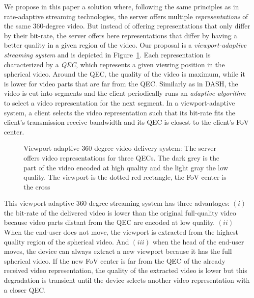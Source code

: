 We propose in this paper a solution where, following the same
principles as in rate-adaptive streaming technologies, the server
offers multiple \emph{representations} of the same 360-degree video.
But instead of offering representations that only differ by their
bit-rate, the server offers here representations that differ by having
a better quality in a given region of the video. Our proposal is a
\emph{viewport-adaptive streaming system} and is depicted in
Figure~\ref{fig:deliverychain}. Each representation is characterized
by a \emph{\ac{QEC}}, which represents a given viewing position in the
spherical video. Around the \ac{QEC}, the quality of the video is
maximum, while it is lower for video parts that are far from the
\ac{QEC}. Similarly as in \ac{DASH}, the video is cut into segments
and the client periodically runs an \emph{adaptive algorithm} to
select a video representation for the next segment. In a
viewport-adaptive system, a client selects the video representation
such that its bit-rate fits the client's transmission receive
bandwidth and its \ac{QEC} is closest to the client's \ac{FoV} center.

\setlength{\textfloatsep}{12pt}
\setlength{\intextsep}{9pt}
\begin{figure}%

   \centering
   
   \caption{Viewport-adaptive 360-degree video delivery system: The server
   offers video representations for three \acp{QEC}. The dark grey is the part of the video encoded at high quality and the light
   gray the low quality. The viewport is the dotted red rectangle, the \ac{FoV} center is the
   cross}
   \label{fig:deliverychain}
\end{figure}

This viewport-adaptive 360-degree streaming system has three
advantages: $(i)$ the bit-rate of the delivered video is lower than
the original full-quality video because video parts distant from the
\ac{QEC} are encoded at low quality. $(ii)$ When the end-user does not
move, the viewport is extracted from the highest quality region of the
spherical video. And $(iii)$ when the head of the end-user moves, the
device can always extract a new viewport because it has the full
spherical video. If the new \ac{FoV} center is far from the \ac{QEC}
of the already received video representation, the quality of the
extracted video is lower but this degradation is transient until the
device selects another video representation with a closer \ac{QEC}.

